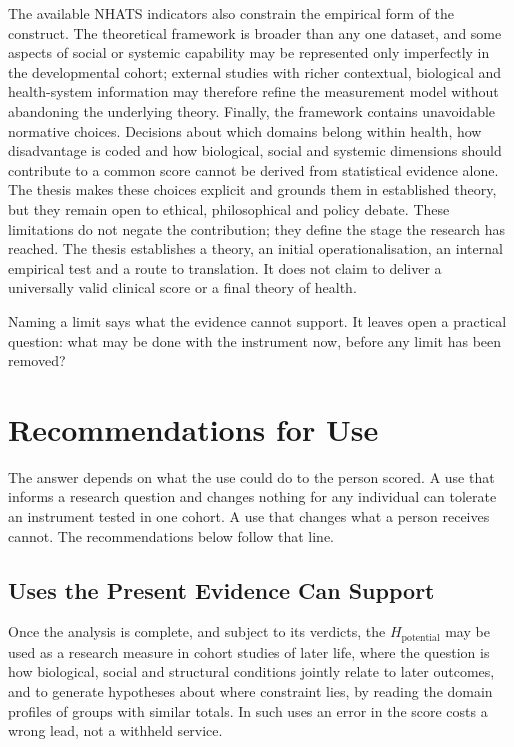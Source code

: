 The available NHATS indicators also constrain the empirical form of the construct. The theoretical framework is broader than any one dataset, and some aspects of social or systemic capability may be represented only imperfectly in the developmental cohort; external studies with richer contextual, biological and health-system information may therefore refine the measurement model without abandoning the underlying theory. Finally, the framework contains unavoidable normative choices. Decisions about which domains belong within health, how disadvantage is coded and how biological, social and systemic dimensions should contribute to a common score cannot be derived from statistical evidence alone. The thesis makes these choices explicit and grounds them in established theory, but they remain open to ethical, philosophical and policy debate. These limitations do not negate the contribution; they define the stage the research has reached. The thesis establishes a theory, an initial operationalisation, an internal empirical test and a route to translation. It does not claim to deliver a universally valid clinical score or a final theory of health.

Naming a limit says what the evidence cannot support. It leaves open a practical
question: what may be done with the instrument now, before any limit has been
removed?

\section{Recommendations for Use}
\label{sec:conc-use}

\noindent The answer depends on what the use could do to the person scored. A
use that informs a research question and changes nothing for any individual can
tolerate an instrument tested in one cohort. A use that changes what a person
receives cannot. The recommendations below follow that line.

\subsection{Uses the Present Evidence Can Support}

Once the analysis is complete, and subject to its verdicts, the
$H_{\text{potential}}$ may be used as a research measure in cohort studies of
later life, where the question is how biological, social and structural
conditions jointly relate to later outcomes, and to generate hypotheses about
where constraint lies, by reading the domain profiles of groups with similar
totals. In such uses an error in the score costs a wrong lead, not a withheld
service.


